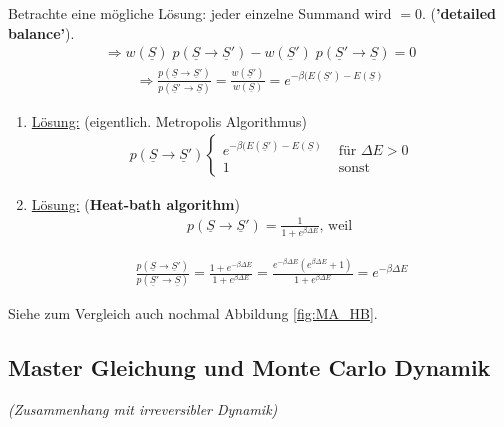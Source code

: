 \documentclass[12pt]{article}
\begin{document}
Betrachte eine mögliche Lösung: jeder einzelne Summand wird $=0$. (\textbf{'detailed balance'}).
 \begin{align}
\Rightarrow   w(\underline{S}) \; p(\underline{S} \rightarrow \underline{S}')- w(\underline{S}') \; p(\underline{S}' \rightarrow \underline{S}) =0 
\end{align}
\begin{align}
\Rightarrow  \frac{p(\underline{S} \rightarrow \underline{S}')}{p(\underline{S}' \rightarrow  \underline{S})} = \frac{w(\underline{S}')}{w(\underline{S})} = e^{-\beta(E(\underline{S}')- E(\underline{S})}
\end{align}
\begin{enumerate}
\item \underline{Lösung:} (eigentlich. Metropolis Algorithmus)
 \begin{align}
p(\underline{S} \rightarrow \underline{S}')
\begin{cases}
e^{-\beta(E(\underline{S}')- E(\underline{S})} & \text{ für } \Delta E > 0 \\
1 & \text{ sonst}
\end{cases}
\end{align} 

\item \underline{Lösung:} (\textbf{Heat-bath algorithm})
\begin{align*}
p(\underline{S} \rightarrow \underline{S}') = \frac{1}{1+ e^{\beta \Delta E}} \mbox{, weil } 
\end{align*}

\begin{align*}
\frac{p(\underline{S} \rightarrow \underline{S}')}{p(\underline{S}' \rightarrow \underline{S})} = \frac{1+e^{-\beta \Delta E} }{1+e^{\beta \Delta E}} = \frac{e^{-\beta \Delta E} (e^{\beta \Delta E}+1)}{1+e^{\beta \Delta E}}= e^{-\beta \Delta E}
\end{align*}
\end{enumerate}
Siehe zum Vergleich auch nochmal Abbildung \ref{fig:MA_HB}.



\subsection{Master Gleichung und Monte Carlo Dynamik}
\textit{(Zusammenhang mit irreversibler Dynamik)}\\
\end{document}
